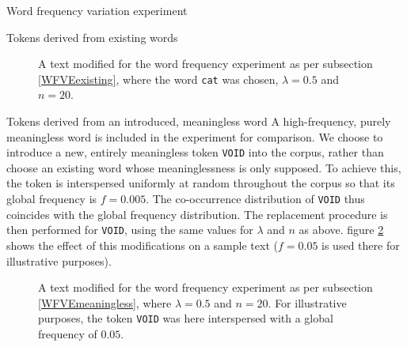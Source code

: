 \documentclass{article} %
\newcommand{\word}[1]{\texttt{#1}}
\begin{document}
\begin{section}{Word frequency variation experiment}
\begin{subsection}{Tokens derived from existing words}
\begin{table}
	
	\caption{Occurrence counts for words chosen for the word frequency experiment. }
	\label{word-frequency-counts}
\end{table}

\begin{figure}
	\begin{mdframed}
	
	\end{mdframed}
	\caption{A text modified for the word frequency experiment as per subsection \ref{WFVEexisting}, where the
	word \word{cat} was chosen, $\lambda=0.5$ and $n=20$.}
	\label{fig:word-frequency-experiment-text-cat}
\end{figure}

\end{subsection}

\begin{subsection}{Tokens derived from an introduced, meaningless word}\label{WFVEmeaningless}
	A high-frequency, purely meaningless word is included in the experiment for comparison.
	We choose to introduce a new, entirely meaningless token \word{VOID} into the corpus, rather than choose an existing word whose meaninglessness is only supposed.
	To achieve this, the token is interspersed uniformly at random throughout the corpus so that its global frequency is $f = 0.005$.
	The co-occurrence distribution of \word{VOID} thus coincides with the global frequency distribution.
	The replacement procedure is then performed for \word{VOID}, using the same values for $\lambda$ and $n$ as above.
	figure \ref{fig:word-frequency-experiment-text-void} shows the effect of this modifications on a sample text ($f = 0.05$ is used there for illustrative purposes).

\begin{figure}
	\begin{mdframed}
	
	\end{mdframed}
	\caption{A text modified for the word frequency experiment as per subsection \ref{WFVEmeaningless}, where $\lambda=0.5$ and $n=20$. For illustrative purposes, the token \word{VOID} was here interspersed with a global frequency of $0.05$.}
	\label{fig:word-frequency-experiment-text-void}
\end{figure}
\end{subsection}


\end{section}
\end{document}
